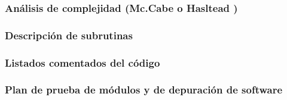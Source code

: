   \subsubsection{Análisis de complejidad (Mc.Cabe o Hasltead )}  

  \newpage




  \subsubsection{Descripción de subrutinas}  

  \newpage




  \subsubsection{Listados comentados del código }  

  \newpage



  \subsubsection{Plan de prueba de módulos y de depuración de software}  

  \newpage

%
